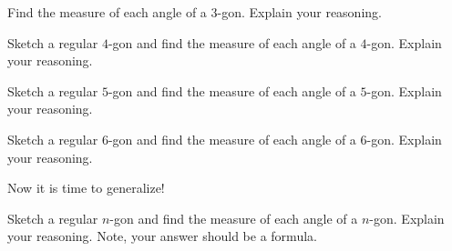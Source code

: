 \begin{prob}
Find the measure of each angle of a $3$-gon. Explain your reasoning.
\end{prob}

\begin{prob}
Sketch a regular $4$-gon and find the measure of each angle of a
$4$-gon. Explain your reasoning.
\end{prob}


\begin{prob}
Sketch a regular $5$-gon and find the measure of each angle of a
$5$-gon. Explain your reasoning.
\end{prob}


\begin{prob}
Sketch a regular $6$-gon and find the measure of each angle of a
$6$-gon. Explain your reasoning.
\end{prob}


Now it is time to generalize!

\begin{prob}
Sketch a regular $n$-gon and find the measure of each angle of a
$n$-gon. Explain your reasoning. Note, your answer should be a formula.
\end{prob}


